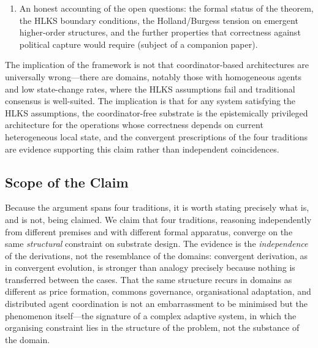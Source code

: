 \documentclass[11pt]{article}
\theoremstyle{definition}
\theoremstyle{plain}
\theoremstyle{plain}
\begin{document}
\begin{enumerate}
\item An honest accounting of the open questions: the formal status of the
  theorem, the HLKS boundary conditions, the Holland/Burgess tension on
  emergent higher-order structures, and the further properties that
  correctness against political capture would require (subject of a
  companion paper).
\end{enumerate}

The implication of the framework is not that coordinator-based architectures
are universally wrong---there are domains, notably those with homogeneous
agents and low state-change rates, where the HLKS assumptions fail and
traditional consensus is well-suited. The implication is that for any system
satisfying the HLKS assumptions, the coordinator-free substrate is the
epistemically privileged architecture for the operations whose correctness depends
on current heterogeneous local state, and the convergent prescriptions of the four
traditions are evidence supporting this claim rather than independent coincidences.

\subsection{Scope of the Claim}
\label{sec:scope}

Because the argument spans four traditions, it is worth stating precisely what is,
and is not, being claimed. We claim that four traditions, reasoning independently
from different premises and with different formal apparatus, converge on the same
\emph{structural} constraint on substrate design. The evidence is the
\emph{independence} of the derivations, not the resemblance of the domains:
convergent derivation, as in convergent evolution, is stronger than analogy
precisely because nothing is transferred between the cases. That the same
structure recurs in domains as different as price formation, commons governance,
organisational adaptation, and distributed agent coordination is not an
embarrassment to be minimised but the phenomenon itself---the signature of a
complex adaptive system, in which the organising constraint lies in the structure
of the problem, not the substance of the domain.
\end{document}
